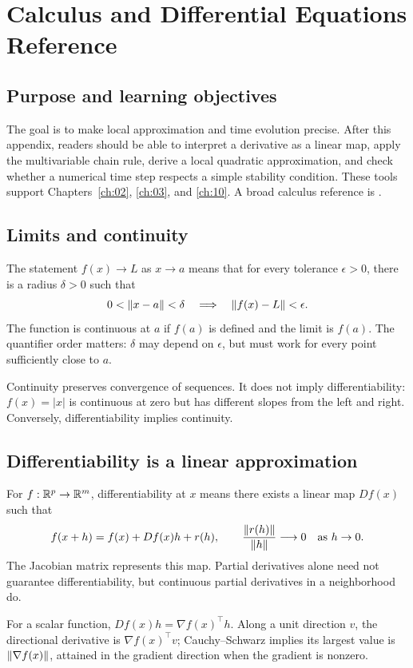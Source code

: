 \chapter{Calculus and Differential Equations Reference}\label{app:b}

\section*{Purpose and learning objectives}
The goal is to make local approximation and time evolution precise. After this appendix, readers should be able to interpret a derivative as a linear map, apply the multivariable chain rule, derive a local quadratic approximation, and check whether a numerical time step respects a simple stability condition. These tools support Chapters~\ref{ch:02}, \ref{ch:03}, and \ref{ch:10}. A broad calculus reference is \citet{ev_strang1991}.

\section{Limits and continuity}
The statement \(f(x)\to L\) as \(x\to a\) means that for every tolerance \(\epsilon>0\), there is a radius \(\delta>0\) such that
\[
0<\left\lVert x-a\right\rVert<\delta \quad\Longrightarrow\quad \left\lVert f(x)-L\right\rVert<\epsilon.
\]
The function is continuous at \(a\) if \(f(a)\) is defined and the limit is \(f(a)\). The quantifier order matters: \(\delta\) may depend on \(\epsilon\), but must work for every point sufficiently close to \(a\).

Continuity preserves convergence of sequences. It does not imply differentiability: \(f(x)=|x|\) is continuous at zero but has different slopes from the left and right. Conversely, differentiability implies continuity.

\section{Differentiability is a linear approximation}
For \(f:\mathbb{R}^p\to\mathbb{R}^m\), differentiability at \(x\) means there exists a linear map \(Df(x)\) such that
\[
f(x+h)=f(x)+Df(x)h+r(h),\qquad
\frac{\left\lVert r(h)\right\rVert}{\left\lVert h\right\rVert}\longrightarrow0
\quad\text{as }h\to0.
\]
The Jacobian matrix represents this map. Partial derivatives alone need not guarantee differentiability, but continuous partial derivatives in a neighborhood do.

For a scalar function, \(Df(x)h=\nabla f(x)^\top h\). Along a unit direction \(v\), the directional derivative is \(\nabla f(x)^\top v\); Cauchy--Schwarz implies its largest value is \(\left\lVert \nabla f(x)\right\rVert\), attained in the gradient direction when the gradient is nonzero.

